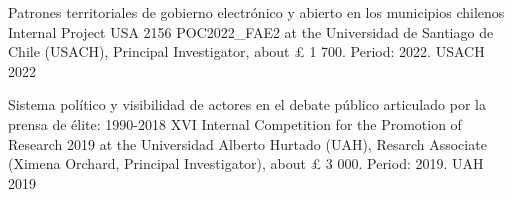 \vspace{1mm}

\begin{cvhonors}
\cvhonor
{Patrones territoriales de gobierno electrónico y abierto en los municipios chilenos}
{Internal Project USA 2156 POC2022\_FAE2 at the Universidad de Santiago de Chile (USACH), Principal Investigator, about {\pounds} 1 700. Period: 2022.}
{USACH}
{2022}
\end{cvhonors}

\vspace{1mm}

\begin{cvhonors}
\cvhonor
{Sistema político y visibilidad de actores en el debate público articulado por la prensa de élite: 1990-2018}
{XVI Internal Competition for the Promotion of Research 2019 at the Universidad Alberto Hurtado (UAH), Resarch Associate (Ximena Orchard, Principal Investigator), about {\pounds} 3 000. Period: 2019.}
{UAH}
{2019}
\end{cvhonors}

\vspace{1mm}


